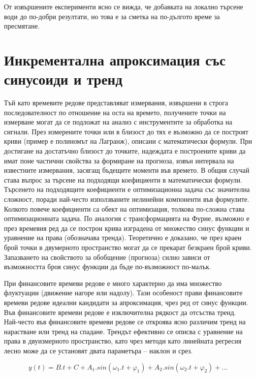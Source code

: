 От извършените експерименти ясно се вижда, че добавката на локално търсене води до по-добри резултати, но това е за сметка на по-дългото време за пресмятане.

\section{Инкрементална апроксимация със синусоиди и тренд}

Тъй като времевите редове представляват измервания, извършени в строга последователност по отношение на оста на времето, получените точки на измерване могат да се подложат на анализ с инструментите за обработка на сигнали. През измерените точки или в близост до тях е възможно да се построят криви (пример е полиномът на Лагранж), описани с математически формули. При достигане на достатъчно близост до точките, надеждата е построените криви да имат поне частични свойства за формиране на прогноза, извън интервала на известните измервания, засягащ бъдещите моменти във времето. В общия случай става въпрос за търсене на подходящи коефициенти в математически формули. Търсенето на подходящите коефициенти е оптимизационна задача със значителна сложност, поради най-често използваните нелинейни компоненти във формулите. Колкото повече коефициенти са обект на оптимизация, толкова по-сложна става оптимизационната задача. По аналогия с трансформацията на Фурие, възможно е през времевия ред да се построи крива изградена от множество синус функции и уравнение на права (обозначава тренда). Теоретично е доказано, че през краен брой точки в двумерното пространство могат да се прекарат безкраен брой криви. Запазването на свойството за обобщение (прогноза) силно зависи от възможността броя синус функции да бъде по-възможност по-малък. 

При финансовите времеви редове е много характерно да има множество флуктуации (движение нагоре или надолу). Тази особеност прави финансовите времеви редове идеални кандидати за апроксимация, чрез ред от синус функции. Във финансовите времеви редове е изключителна рядкост да отсъства тренд. Най-често във финансовите времеви редове се откроява ясно различим тренд на нарастване или тренд на спадане. Трендът ефективно се описва с уравнение на права в двуизмерното пространство, като чрез методи като линейната регресия лесно може да се установят двата параметъра – наклон и срез. 

\begin{equation}  \label{equ001}
y(t) = B.t + C + A_1.sin(\omega_1.t+\varphi_1) + A_2.sin(\omega_2.t+\varphi_2) + ...
\end{equation}


